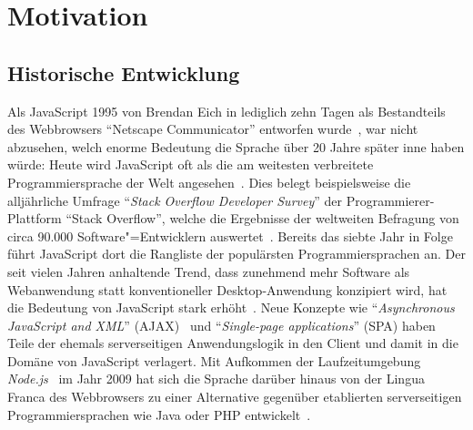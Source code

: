 \chapter{Motivation}
\label{chap:motiviation}

\section{Historische Entwicklung}

Als JavaScript 1995 von Brendan Eich in lediglich zehn Tagen als Bestandteils des Webbrowsers \enquote{Netscape Communicator} entworfen wurde~\autocite{severance:2012:js10days}, war nicht abzusehen, welch enorme Bedeutung die Sprache über 20 Jahre später inne haben würde: Heute wird JavaScript oft als die am weitesten verbreitete Programmiersprache der Welt angesehen~\autocite{PAULSON:2007,CROCKFORD:JS_POPULAR}. Dies belegt beispielsweise die alljährliche Umfrage \enquote{\textit{Stack Overflow Developer Survey}} der Programmierer-Plattform \enquote{Stack Overflow}, welche die Ergebnisse der weltweiten Befragung von circa 90.000 Software"=Entwicklern auswertet~\autocite{STACKOVERFLOW:SURVEY}. Bereits das siebte Jahr in Folge führt JavaScript dort die Rangliste der populärsten Programmiersprachen an. Der seit vielen Jahren anhaltende Trend, dass zunehmend mehr Software als Webanwendung statt konventioneller Desktop-Anwendung konzipiert wird, hat die Bedeutung von JavaScript stark erhöht~\autocite{TAIVALSAARI:2017,CASTELEYN:2014}. Neue Konzepte wie \enquote{\textit{Asynchronous JavaScript and XML}} (AJAX)~\autocite{GARRET:AJAX} und \enquote{\textit{Single-page applications}} (SPA) haben Teile der ehemals serverseitigen Anwendungslogik in den Client und damit in die Domäne von JavaScript verlagert. Mit Aufkommen der Laufzeitumgebung \textit{Node.js}~\autocite{SOFTWARE:NODEJS} im Jahr 2009 hat sich die Sprache darüber hinaus von der Lingua Franca des Webbrowsers zu einer Alternative gegenüber etablierten serverseitigen Programmiersprachen wie Java oder PHP entwickelt~\autocite{TILKOV:NODEJS}.

